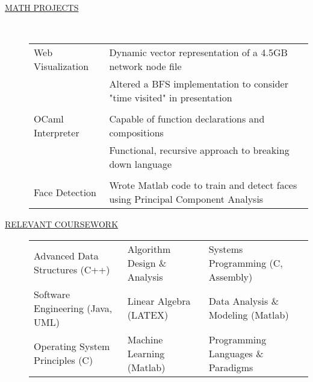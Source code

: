 \documentclass[12pt]{article}
\begin{document}
\begin{description}
	\iffalse
        \item[\underline{MATH PROJECTS}] \hfill \\
            \begin{tabular}{l|l}
                Web Visualization& Dynamic vector representation of a 4.5GB network node file\\
                                 & Altered a BFS implementation to consider "time visited" in presentation\\
					\\
                OCaml Interpreter& Capable of function declarations and compositions \\
                                 & Functional, recursive approach to breaking down language \\
					\\
                Face Detection   & Wrote Matlab code to train and detect faces using Principal Component Analysis\\

            \end{tabular}

        \item[\underline{RELEVANT COURSEWORK}]\hfill

            \begin{tabular}{l|l|l}
                Advanced Data Structures (C++)& Algorithm Design \& Analysis & Systems Programming (C, Assembly)\\
             Software Engineering (Java, UML) & Linear Algebra (LATEX) &  Data Analysis \& Modeling (Matlab) \\
                  Operating System Principles (C) & Machine Learning (Matlab) & Programming Languages \& Paradigms\\
            \end{tabular}


\end{description}
\end{document}

